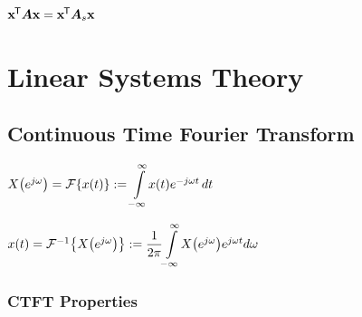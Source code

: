 \documentclass[11pt]{article}
\begin{document}
  \(\mathbf{x}^{\mkern-1.5mu\mathsf{T}} \bm{A} \mathbf{x} = \mathbf{x}^{\mkern-1.5mu\mathsf{T}} \bm{A}_s\mathbf{x}\)

  \pagebreak

  \section{Linear Systems Theory}

  \subsection{Continuous Time Fourier Transform}

  \begin{multicols}{2}
    \(X{\left( e^{j\omega} \right)} = \mathcal{F}{\left\{ x(t) \right\}} := \displaystyle{\int\limits_{-\infty}^{\infty}} \textstyle x(t)e^{-j\omega t}\, dt\)

    \columnbreak

    \(x(t) = \mathcal{F}^{-1}{\left\{ X{\left( e^{j\omega} \right)} \right\}} := \dfrac{1}{2\pi}\displaystyle{\int\limits_{-\infty}^{\infty}} \textstyle X{\left( e^{j\omega} \right)}e^{j\omega t} d\omega\)
  \end{multicols}

  \subsubsection{CTFT Properties}
\end{document}
